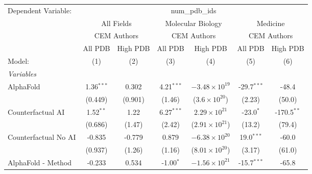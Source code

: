 \begingroup
\centering
\begin{tabular}{lcccccc}
   \tabularnewline \midrule \midrule
   Dependent Variable: & \multicolumn{6}{c}{num\_pdb\_ids}\\
 & \multicolumn{2}{c}{All Fields} & \multicolumn{2}{c}{Molecular Biology} & \multicolumn{2}{c}{Medicine} \\
\cmidrule(lr){2-3} \cmidrule(lr){4-5} \cmidrule(lr){6-7}
 & \multicolumn{2}{c}{CEM Authors} & \multicolumn{2}{c}{CEM Authors} & \multicolumn{2}{c}{CEM Authors} \\
\cmidrule(lr){2-3} \cmidrule(lr){4-5} \cmidrule(lr){6-7}
 & \multicolumn{1}{c}{All PDB} & \multicolumn{1}{c}{High PDB} & \multicolumn{1}{c}{All PDB} & \multicolumn{1}{c}{High PDB} & \multicolumn{1}{c}{All PDB} & \multicolumn{1}{c}{High PDB} \\
\cmidrule(lr){2-2} \cmidrule(lr){3-3} \cmidrule(lr){4-4} \cmidrule(lr){5-5} \cmidrule(lr){6-6} \cmidrule(lr){7-7}
   Model:                                                     & (1)          & (2)     & (3)          & (4)                     & (5)           & (6)\\  
   \midrule
   \emph{Variables}\\
   AlphaFold                                                  & 1.36$^{***}$ & 0.302   & 4.21$^{***}$ & $-3.48\times 10^{19}$   & -29.7$^{***}$ & -48.4\\   
                                                              & (0.449)      & (0.901) & (1.46)       & ($3.6\times 10^{20}$)   & (2.23)        & (50.0)\\   
   Counterfactual AI                                          & 1.52$^{**}$  & 1.22    & 6.27$^{***}$ & $2.29\times 10^{21}$    & -23.0$^{*}$   & -170.5$^{**}$\\   
                                                              & (0.686)      & (1.47)  & (2.42)       & ($2.91\times 10^{21}$)  & (13.2)        & (79.4)\\   
   Counterfactual No AI                                       & -0.835       & -0.779  & 0.879        & $-6.38\times 10^{20}$   & 19.0$^{***}$  & -60.0\\   
                                                              & (0.937)      & (1.26)  & (1.16)       & ($8.01\times 10^{20}$)  & (3.17)        & (61.0)\\   
   AlphaFold - Method                                         & -0.233       & 0.534   & -1.00$^{*}$  & $-1.56\times 10^{21}$   & -15.7$^{***}$ & -65.8\\   

\end{tabular}
